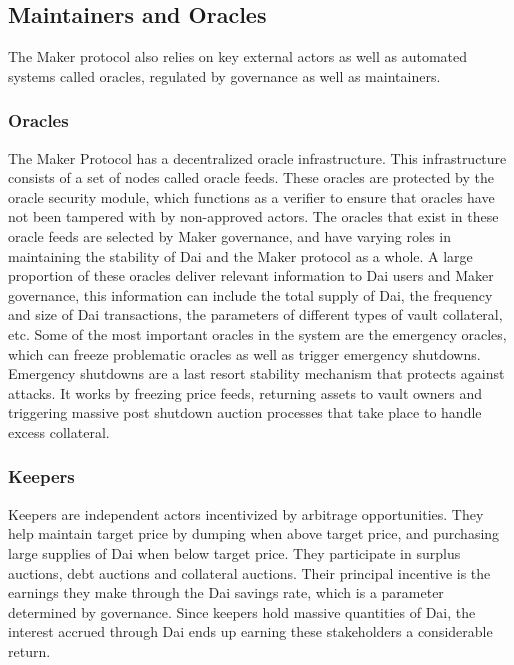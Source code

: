 \documentclass[bsc,frontabs,singlespacing,parskip,deptreport]{infthesis}
\begin{document}
    \subsection{Maintainers and Oracles}
    The Maker protocol also relies on key external actors as well as automated systems called oracles, regulated by governance as well as maintainers.
    \subsubsection{Oracles}
    The Maker Protocol has a decentralized oracle infrastructure. This infrastructure consists of a set of nodes called oracle feeds. These oracles are protected by the oracle security module, which functions as a verifier to ensure that oracles have not been tampered with by non-approved actors. 
    \smallbreak \noindent
    The oracles that exist in these oracle feeds are selected by Maker governance, and have varying roles in maintaining the stability of Dai and the Maker protocol as a whole. A large proportion of these oracles deliver relevant information to Dai users and Maker governance, this information can include the total supply of Dai, the frequency and size of Dai transactions, the parameters of different types of vault collateral, etc. 
    \smallbreak \noindent 
    Some of the most important oracles in the system are the emergency oracles, which can freeze problematic oracles as well as trigger emergency shutdowns. Emergency shutdowns are a last resort stability mechanism that protects against attacks. It works by freezing price feeds, returning assets to vault owners and triggering massive post shutdown auction processes that take place to handle excess collateral. 
    \subsubsection{Keepers}
    Keepers are independent actors incentivized by arbitrage opportunities. They help maintain target price by dumping when above target price, and purchasing large supplies of Dai when below target price. They participate in surplus auctions, debt auctions and collateral auctions. Their principal incentive is the earnings they make through the Dai savings rate, which is a parameter determined by governance. Since keepers hold massive quantities of Dai, the interest accrued through Dai ends up earning these stakeholders a considerable return. 
\end{document}
